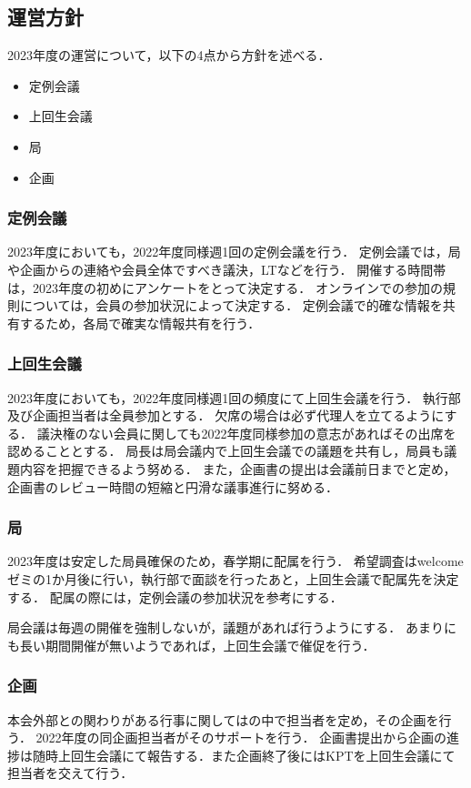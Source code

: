 \subsection*{運営方針}


2023年度の運営について，以下の4点から方針を述べる．
\begin{itemize}
    \item 定例会議
    \item 上回生会議
    \item 局
    \item 企画
\end{itemize}

\subsubsection*{定例会議}
2023年度においても，2022年度同様週1回の定例会議を行う．
定例会議では，局や企画からの連絡や会員全体ですべき議決，LTなどを行う．
開催する時間帯は，2023年度の初めにアンケートをとって決定する．
オンラインでの参加の規則については，会員の参加状況によって決定する．
定例会議で的確な情報を共有するため，各局で確実な情報共有を行う．

\subsubsection*{上回生会議}
2023年度においても，2022年度同様週1回の頻度にて上回生会議を行う．
執行部及び企画担当者は全員参加とする．
欠席の場合は必ず代理人を立てるようにする．
議決権のない会員に関しても2022年度同様参加の意志があればその出席を認めることとする．
局長は局会議内で上回生会議での議題を共有し，局員も議題内容を把握できるよう努める．
また，企画書の提出は会議前日までと定め，企画書のレビュー時間の短縮と円滑な議事進行に努める．

\subsubsection*{局}
2023年度は安定した局員確保のため，春学期に配属を行う．
希望調査はwelcomeゼミの1か月後に行い，執行部で面談を行ったあと，上回生会議で配属先を決定する．
配属の際には，定例会議の参加状況を参考にする．

局会議は毎週の開催を強制しないが，議題があれば行うようにする．
あまりにも長い期間開催が無いようであれば，上回生会議で催促を行う．

\subsubsection*{企画}
本会外部との関わりがある行事に関しては\newGradeIfKouki{}\secondGrade{}の中で担当者を定め，その企画を行う．
2022年度の同企画担当者がそのサポートを行う．
企画書提出から企画の進捗は随時上回生会議にて報告する．また企画終了後にはKPTを上回生会議にて担当者を交えて行う．
